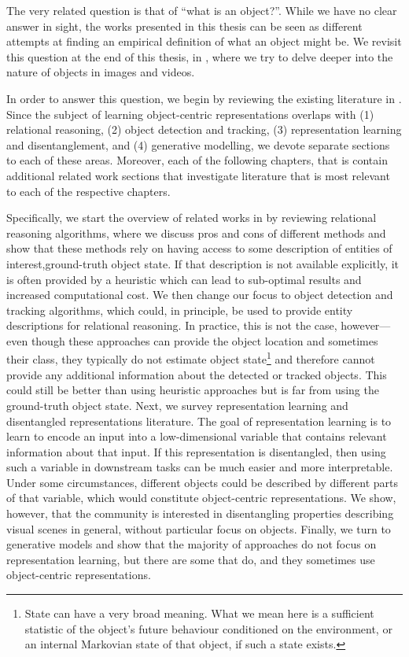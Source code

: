 The very related question is that of ``what is an object?''.
While we have no clear answer in sight, the works presented in this thesis can be seen as different attempts at finding an empirical definition of what an object might be.
We revisit this question at the end of this thesis, in , where we try to delve deeper into the nature of objects in images and videos.

In order to answer this question, we begin by reviewing the existing literature in . 
Since the subject of learning object-centric representations overlaps with
(1) relational reasoning,
(2) object detection and tracking,
(3) representation learning and disentanglement, and
(4) generative modelling, we devote separate sections to each of these areas. 
Moreover, each of the following chapters, that is  contain additional related work sections that investigate literature that is most relevant to each of the respective chapters.

Specifically, we start the overview of related works in  by reviewing relational reasoning algorithms, where we discuss pros and cons of different methods and show that these methods rely on having access to some description of entities of interest,\eg ground-truth object state.
If that description is not available explicitly, it is often provided by a heuristic which can lead to sub-optimal results and increased computational cost.
We then change our focus to object detection and tracking algorithms, which could, in principle, be used to provide entity descriptions for relational reasoning. In practice, this is not the case, however---even though these approaches can provide the object location and sometimes their class, they typically do not estimate object state\footnote{State can have a very broad meaning. What we mean here is a sufficient statistic of the object's future behaviour conditioned on the environment, or an internal Markovian state of that object, if such a state exists.} and therefore cannot provide any additional information about the detected or tracked objects.
This could still be better than using heuristic approaches but is far from using the ground-truth object state.
Next, we survey representation learning and disentangled representations literature.
The goal of representation learning is to learn to encode an input into a low-dimensional variable that contains relevant information about that input.
If this representation is disentangled, then using such a variable in downstream tasks can be much easier and more interpretable.
Under some circumstances, different objects could be described by different parts of that variable, which would constitute object-centric representations.
We show, however, that the community is interested in disentangling properties describing visual scenes in general, without particular focus on objects.
Finally, we turn to generative models and show that the majority of approaches do not focus on representation learning, but there are some that do, and they sometimes use object-centric representations.

